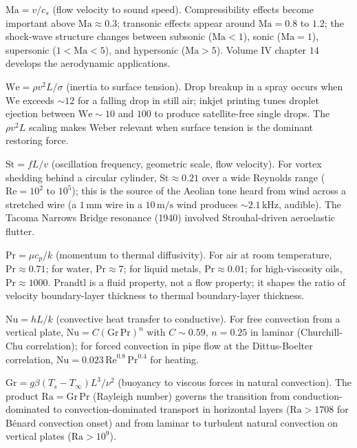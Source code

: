  $\mathrm{Ma} = v/c_{s}$ (flow velocity to
sound speed). Compressibility effects become important above
$\mathrm{Ma} \approx 0.3$; transonic effects appear around
$\mathrm{Ma} = 0.8$ to $1.2$; the shock-wave structure changes
between subsonic ($\mathrm{Ma} < 1$), sonic ($\mathrm{Ma} = 1$),
supersonic ($1 < \mathrm{Ma} < 5$), and hypersonic
($\mathrm{Ma} > 5$). Volume IV chapter $14$ develops the aerodynamic
applications.

 $\mathrm{We} = \rho v^{2} L/\sigma$ (inertia
to surface tension). Drop breakup in a spray occurs when
$\mathrm{We}$ exceeds $\sim 12$ for a falling drop in still air;
inkjet printing tunes droplet ejection between $\mathrm{We} \sim
10$ and $100$ to produce satellite-free single drops. The
$\rho v^{2} L$ scaling makes Weber relevant when surface tension is
the dominant restoring force.

 $\mathrm{St} = f L/v$ (oscillation
frequency, geometric scale, flow velocity). For vortex shedding
behind a circular cylinder, $\mathrm{St} \approx 0.21$ over a
wide Reynolds range ($\mathrm{Re} = 10^{2}$ to $10^{5}$); this is
the source of the Aeolian tone heard from wind across a stretched
wire (a $1\,\si{\milli\meter}$ wire in a $10\,\si{\meter\per\second}$
wind produces $\sim 2.1\,\si{\kilo\hertz}$, audible). The Tacoma
Narrows Bridge resonance (1940) involved Strouhal-driven aeroelastic
flutter.

 $\mathrm{Pr} = \mu c_{p}/k$ (momentum to
thermal diffusivity). For air at room temperature, $\mathrm{Pr}
\approx 0.71$; for water, $\mathrm{Pr} \approx 7$; for liquid
metals, $\mathrm{Pr} \approx 0.01$; for high-viscosity oils,
$\mathrm{Pr} \approx 1000$. Prandtl is a fluid property, not a
flow property; it shapes the ratio of velocity boundary-layer
thickness to thermal boundary-layer thickness.

 $\mathrm{Nu} = h L/k$ (convective heat
transfer to conductive). For free convection from a vertical
plate, $\mathrm{Nu} = C(\mathrm{Gr}\, \mathrm{Pr})^{n}$ with $C
\sim 0.59$, $n = 0.25$ in laminar (Churchill-Chu correlation);
for forced convection in pipe flow at the Dittus-Boelter
correlation, $\mathrm{Nu} = 0.023\,\mathrm{Re}^{0.8}\,
\mathrm{Pr}^{0.4}$ for heating.

 $\mathrm{Gr} = g\beta(T_{s} - T_{\infty})
L^{3}/\nu^{2}$ (buoyancy to viscous forces in natural convection).
The product $\mathrm{Ra} = \mathrm{Gr}\,\mathrm{Pr}$ (Rayleigh
number) governs the transition from conduction-dominated to
convection-dominated transport in horizontal layers
($\mathrm{Ra} > 1708$ for B\'enard convection onset) and from
laminar to turbulent natural convection on vertical plates
($\mathrm{Ra} > 10^{9}$).

